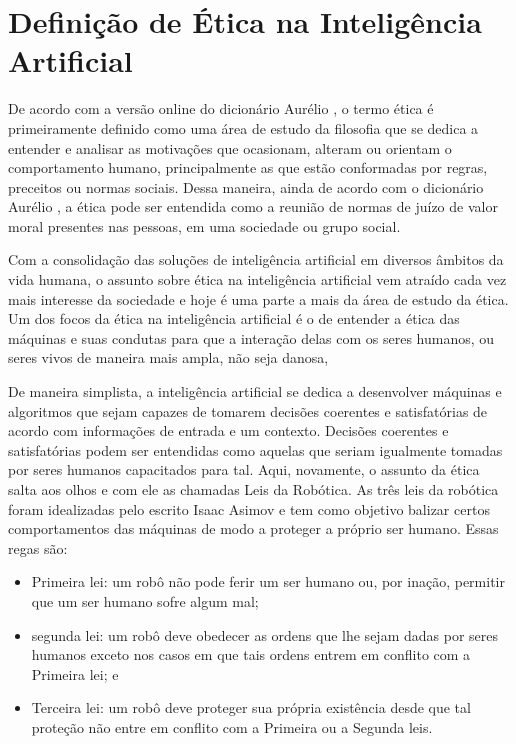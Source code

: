 \documentclass{article}
\begin{document}
%
\section*{Definição de Ética na Inteligência Artificial}
De acordo com a versão online do dicionário Aurélio \cite{aurelio_online}, o termo ética é primeiramente definido como uma área de estudo da filosofia que se dedica a entender e analisar as motivações que ocasionam, alteram ou orientam o comportamento humano, principalmente as que estão conformadas por regras, preceitos ou normas sociais. Dessa maneira, ainda de acordo com o dicionário Aurélio \cite{aurelio_online}, a ética pode ser entendida como a reunião de normas de juízo de valor moral presentes nas pessoas, em uma sociedade ou grupo social. 

Com a consolidação das soluções de inteligência artificial em diversos âmbitos da vida humana, o assunto sobre ética na inteligência artificial vem atraído cada vez mais interesse da sociedade e hoje é uma parte a mais da área de estudo da ética. Um dos focos da ética na inteligência artificial é o de entender a ética das máquinas e suas condutas para que a interação delas com os seres humanos, ou seres vivos de maneira mais ampla, não seja danosa, 

De maneira simplista, a inteligência artificial se dedica a desenvolver máquinas e algoritmos que sejam capazes de tomarem decisões coerentes e satisfatórias de acordo com informações de entrada e um contexto. Decisões coerentes e satisfatórias podem ser entendidas como aquelas que seriam igualmente tomadas por seres humanos capacitados para tal. Aqui, novamente, o assunto da ética salta aos olhos e com ele as chamadas Leis da Robótica. As três leis da robótica foram idealizadas pelo escrito Isaac Asimov e tem como objetivo balizar certos comportamentos das máquinas de modo a proteger a próprio ser humano. Essas regas são:
\begin{itemize}
	\item Primeira lei: um robô não pode ferir um ser humano ou, por inação, permitir que um ser humano sofre algum mal;
	\item segunda lei: um robô deve obedecer as ordens que lhe sejam dadas por seres humanos exceto nos casos em que tais ordens entrem em conflito com a Primeira lei; e
	\item Terceira lei: um robô deve proteger sua própria existência desde que tal proteção não entre em conflito com a Primeira ou a Segunda leis.
\end{itemize}
\end{document}
